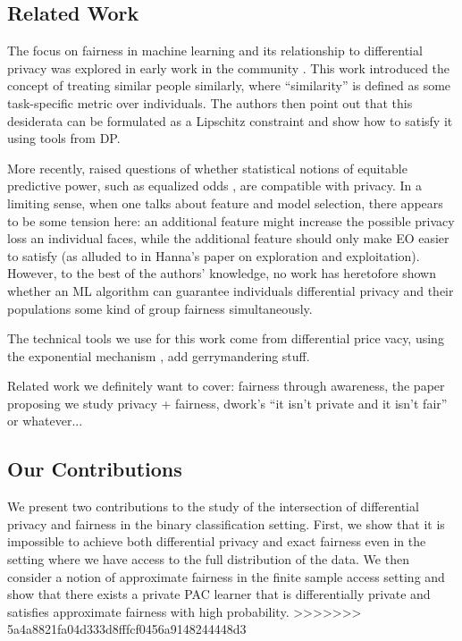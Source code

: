 
\subsection{Related Work}

The focus on fairness in machine learning and its relationship to
differential privacy was explored in early work in the community \citep{dworkfta}. This work introduced the concept of
treating similar people similarly, where ``similarity'' is defined as
some task-specific metric over individuals.  The authors then point
out that this desiderata can be formulated as a Lipschitz constraint
and show how to satisfy it using tools from DP.

More recently, \citet{ekstrandprivfair} raised questions of whether
statistical notions of equitable predictive power, such as equalized
odds \cite{hardteqop}, are compatible with privacy. In a limiting sense,
when one talks about feature and model selection, there appears to be
some tension here: an additional feature might increase the possible
privacy loss an individual faces, while the additional feature should
only make EO easier to satisfy (as alluded to in Hanna's paper on
exploration and exploitation). However, to the best of the authors'
knowledge, no work has heretofore shown whether an ML algorithm can
guarantee individuals differential privacy and their populations some
kind of group fairness simultaneously.

The technical tools we use for this work come from differential price
vacy, using the exponential mechanism \cite{2dplimits}, add gerrymandering stuff.



Related work we definitely want to cover: fairness through awareness,
the paper proposing we study privacy + fairness, dwork's ``it isn't
private and it isn't fair'' or whatever...

\subsection{Our Contributions}
We present two contributions to the study of the intersection of
differential privacy and fairness in the binary classification setting.
First, we show that it is impossible to achieve both differential
privacy and exact fairness even in the setting where we have access to
the full distribution of the data. We then consider a notion of
approximate fairness in the finite sample access setting and show that
there exists a private PAC learner that is differentially private and
satisfies approximate fairness with high probability. 
>>>>>>> 5a4a8821fa04d333d8fffcf0456a9148244448d3

